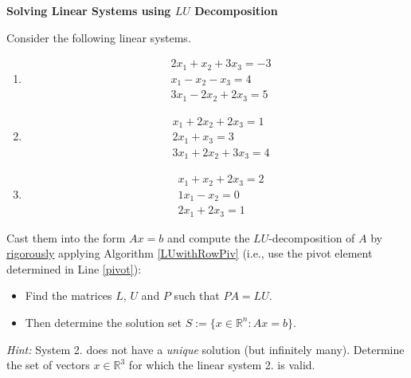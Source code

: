\textbf{Solving Linear Systems using $LU$ Decomposition}

Consider the following linear systems.
\begin{enumerate}
	\item 		\begin{align*}
	&2 x_1 + x_2 + 3x_3 = -3\\
	&x_1 - x_2 - x_3 = 4\\
	&3x_1 - 2x_2 + 2x_3 = 5
	\end{align*}
	\item \begin{align*}
	&x_1 + 2 x_2 + 2x_3  = 1\\
	&2x_1 + x_3 = 3\\
	&3x_1 + 2x_2 + 3x_3 = 4
	\end{align*}
	\item \begin{align*}
			&x_1 +  x_2 + 2x_3  = 2\\
			&1x_1 -x_2 = 0\\
			&2x_1 + 2x_3 = 1
\end{align*}
\end{enumerate}
Cast them into the form $Ax = b$ and compute the $LU$-decomposition of $A$ by \underline{rigorously} applying Algorithm \ref{LUwithRowPiv} (i.e., use the pivot element determined in Line \ref{pivot}):
\begin{itemize}
	\item  Find the matrices $L$, $U$ and $P$ such that $PA=LU$.
	\item Then determine the solution set $S:= \{x\in \mathbb{R}^n:Ax =b  \}$.
\end{itemize}
\textit{Hint: } System 2. does not have a \textit{unique} solution (but infinitely many). Determine the set of vectors $x\in \mathbb{R}^3$ for which the linear system 2. is valid.
